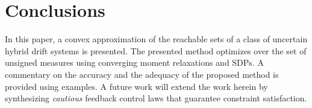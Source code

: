 \section{Conclusions}
\label{sec:conclusion}
In this paper, a convex approximation of the reachable sets of a class of uncertain hybrid drift systems is presented. The presented method optimizes over the set of unsigned measures using converging moment relaxations and SDPs. A commentary on the accuracy and the adequacy of the proposed method is provided using examples. A future work will extend the work herein by synthesizing \emph{cautious} feedback control laws that guarantee constraint satisfaction.